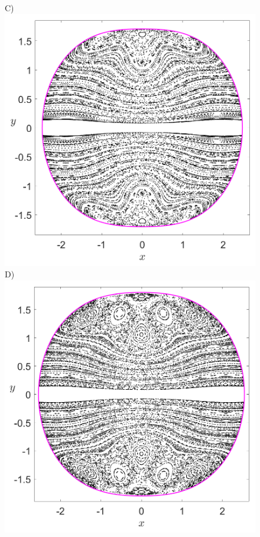 \documentclass[10pt,aps,onecolumn,superscriptaddress]{revtex4-2}
\begin{document}
\begin{figure}[htbp]
	C)\includegraphics[scale=0.3]{PS_py_0_H_-0_2_w0_1div2_k_sqrt7_min_3delta_d_1.png}
	D)\includegraphics[scale=0.3]{PS_py_0_H_-0_2_w0_1div2_k_sqrt7_min_2delta_d_1.png}

\end{figure}
\end{document}
